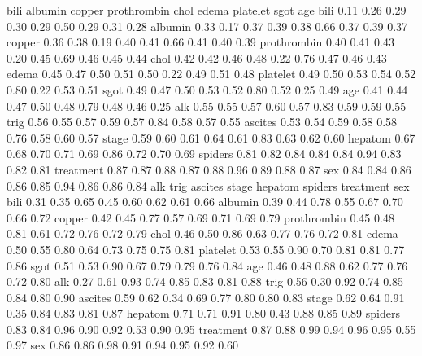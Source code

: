 \documentclass[article, nojss]{jss}
\begin{document}
\begin{Schunk}
\begin{Soutput}
            bili albumin copper prothrombin chol edema platelet sgot  age
bili        0.11    0.26   0.29        0.30 0.29  0.50     0.29 0.31 0.28
albumin     0.33    0.17   0.37        0.39 0.38  0.66     0.37 0.39 0.37
copper      0.36    0.38   0.19        0.40 0.41  0.66     0.41 0.40 0.39
prothrombin 0.40    0.41   0.43        0.20 0.45  0.69     0.46 0.45 0.44
chol        0.42    0.42   0.46        0.48 0.22  0.76     0.47 0.46 0.43
edema       0.45    0.47   0.50        0.51 0.50  0.22     0.49 0.51 0.48
platelet    0.49    0.50   0.53        0.54 0.52  0.80     0.22 0.53 0.51
sgot        0.49    0.47   0.50        0.53 0.52  0.80     0.52 0.25 0.49
age         0.41    0.44   0.47        0.50 0.48  0.79     0.48 0.46 0.25
alk         0.55    0.55   0.57        0.60 0.57  0.83     0.59 0.59 0.55
trig        0.56    0.55   0.57        0.59 0.57  0.84     0.58 0.57 0.55
ascites     0.53    0.54   0.59        0.58 0.58  0.76     0.58 0.60 0.57
stage       0.59    0.60   0.61        0.64 0.61  0.83     0.63 0.62 0.60
hepatom     0.67    0.68   0.70        0.71 0.69  0.86     0.72 0.70 0.69
spiders     0.81    0.82   0.84        0.84 0.84  0.94     0.83 0.82 0.81
treatment   0.87    0.87   0.88        0.87 0.88  0.96     0.89 0.88 0.87
sex         0.84    0.84   0.86        0.86 0.85  0.94     0.86 0.86 0.84
             alk trig ascites stage hepatom spiders treatment  sex
bili        0.31 0.35    0.65  0.45    0.60    0.62      0.61 0.66
albumin     0.39 0.44    0.78  0.55    0.67    0.70      0.66 0.72
copper      0.42 0.45    0.77  0.57    0.69    0.71      0.69 0.79
prothrombin 0.45 0.48    0.81  0.61    0.72    0.76      0.72 0.79
chol        0.46 0.50    0.86  0.63    0.77    0.76      0.72 0.81
edema       0.50 0.55    0.80  0.64    0.73    0.75      0.75 0.81
platelet    0.53 0.55    0.90  0.70    0.81    0.81      0.77 0.86
sgot        0.51 0.53    0.90  0.67    0.79    0.79      0.76 0.84
age         0.46 0.48    0.88  0.62    0.77    0.76      0.72 0.80
alk         0.27 0.61    0.93  0.74    0.85    0.83      0.81 0.88
trig        0.56 0.30    0.92  0.74    0.85    0.84      0.80 0.90
ascites     0.59 0.62    0.34  0.69    0.77    0.80      0.80 0.83
stage       0.62 0.64    0.91  0.35    0.84    0.83      0.81 0.87
hepatom     0.71 0.71    0.91  0.80    0.43    0.88      0.85 0.89
spiders     0.83 0.84    0.96  0.90    0.92    0.53      0.90 0.95
treatment   0.87 0.88    0.99  0.94    0.96    0.95      0.55 0.97
sex         0.86 0.86    0.98  0.91    0.94    0.95      0.92 0.60
\end{Soutput}
\end{Schunk}
\end{document}
